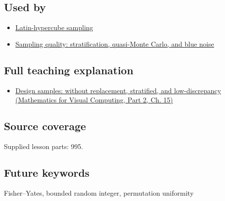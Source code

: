 \subsection{Used by}\label{appendix-184fcc411663-used-by}

\hypertarget{appendix-184fcc411663-used-by}{}

\begin{itemize}
\tightlist
\item
  \hyperref[appendix-1c5e85693a06]{Latin-hypercube sampling}
\item
  \hyperref[appendix-9f693ffd82bc]{Sampling quality: stratification, quasi-Monte Carlo, and blue noise}
\end{itemize}

\subsection{Full teaching explanation}\label{appendix-184fcc411663-full-teaching-explanation}

\hypertarget{appendix-184fcc411663-full-teaching-explanation}{}

\begin{itemize}
\tightlist
\item
  \href{../02-Mathematics-for-Visual-Computing-P02/main.pdf\#nameddest=02-foundations-ii-ch031-design-samples-without-replacement-stratified-and-low-discrepancy}{Design samples: without replacement, stratified, and low-discrepancy (Mathematics for Visual Computing, Part 2, Ch. 15)}
\end{itemize}

\subsection{Source coverage}\label{appendix-184fcc411663-source-coverage}

\hypertarget{appendix-184fcc411663-source-coverage}{}

Supplied lesson parts: 995.

\subsection{Future keywords}\label{appendix-184fcc411663-future-keywords}

\hypertarget{appendix-184fcc411663-future-keywords}{}

Fisher--Yates, bounded random integer, permutation uniformity
